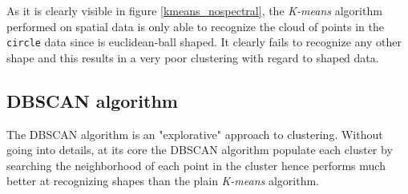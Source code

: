   As it is clearly visible in figure \ref*{kmeans_nospectral}, the \textit{K-means} algorithm performed on spatial data is only able to recognize the cloud of points in the \texttt{circle} data since is euclidean-ball shaped. It clearly fails to recognize any other shape and this results in a very poor clustering with regard to shaped data.

  \subsection{DBSCAN algorithm}
  The DBSCAN algorithm is an "explorative" approach to clustering. Without going into details, at its core the DBSCAN algorithm populate each cluster by searching the neighborhood of each point in the cluster hence performs much better at recognizing shapes than the plain \textit{K-means} algorithm.

